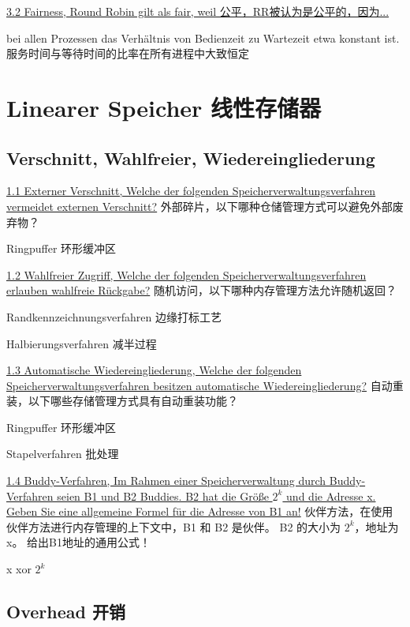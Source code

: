 \documentclass[fleqn]{article}
\begin{document}
\noindent\uline{3.2 Fairness, Round Robin gilt als fair, weil 公平，RR被认为是公平的，因为...}

bei allen Prozessen das Verhältnis von Bedienzeit zu Wartezeit etwa konstant ist.
服务时间与等待时间的比率在所有进程中大致恒定




\section{Linearer Speicher 线性存储器}

\subsection{Verschnitt, Wahlfreier, Wiedereingliederung}

\noindent\uline{1.1	Externer Verschnitt, Welche der folgenden Speicherverwaltungsverfahren vermeidet externen Verschnitt?}
外部碎片，以下哪种仓储管理方式可以避免外部废弃物？

Ringpuffer 环形缓冲区

\noindent\uline{1.2	Wahlfreier Zugriff, Welche der folgenden Speicherverwaltungsverfahren erlauben wahlfreie Rückgabe?}
随机访问，以下哪种内存管理方法允许随机返回？

Randkennzeichnungsverfahren 边缘打标工艺
	
Halbierungsverfahren 减半过程

\noindent\uline{1.3	Automatische Wiedereingliederung, Welche der folgenden Speicherverwaltungsverfahren besitzen automatische Wiedereingliederung?}
自动重装，以下哪些存储管理方式具有自动重装功能？

Ringpuffer 环形缓冲区

Stapelverfahren 批处理

\noindent\uline{1.4	Buddy-Verfahren, Im Rahmen einer Speicherverwaltung durch Buddy-Verfahren seien B1 und B2 Buddies. B2 hat die Größe $2^k$ und die Adresse x. Geben Sie eine allgemeine Formel für die Adresse von B1 an!}
伙伴方法，在使用伙伴方法进行内存管理的上下文中，B1 和 B2 是伙伴。 B2 的大小为 $ 2^k $，地址为 x。 给出B1地址的通用公式！

x xor $2^k$



\subsection{Overhead 开销}
\end{document}
